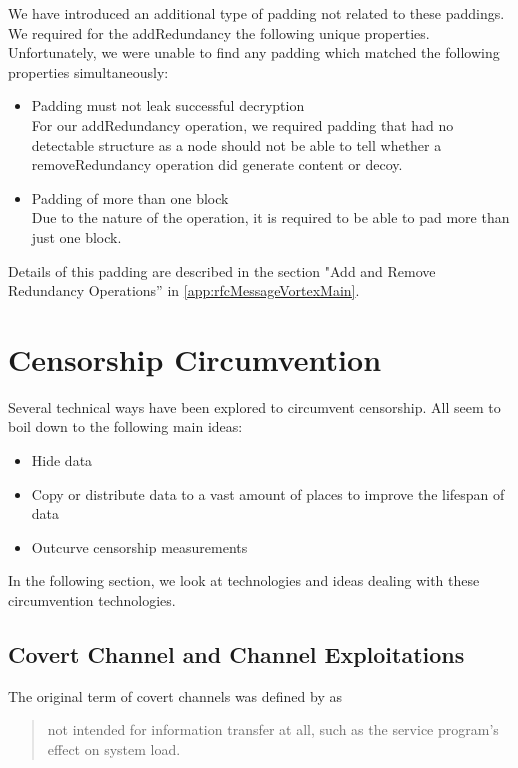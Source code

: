 We have introduced an additional type of padding not related to these paddings. We required for the addRedundancy the following unique properties. Unfortunately, we were unable to find any padding which matched the following properties simultaneously:

\begin{itemize}
	\item Padding must not leak successful decryption\\
	For our addRedundancy operation, we required padding that had no detectable structure as a node should not be able to tell whether a removeRedundancy operation did generate content or decoy. 
	\item Padding of more than one block\\
	Due to the nature of the operation, it is required to be able to pad more than just one block.
\end{itemize}

Details of this padding are described in the section "Add and Remove Redundancy Operations'' in \cref{app:rfcMessageVortexMain}. 

\chapter{Censorship Circumvention}
Several technical ways have been explored to circumvent censorship. All seem to boil down to the following main ideas:
\begin{itemize}
	\item Hide data
	\item Copy or distribute data to a vast amount of places to improve the lifespan of data
	\item Outcurve censorship measurements
\end{itemize}

In the following section, we look at technologies and ideas dealing with these circumvention technologies.

\section{Covert Channel and Channel Exploitations}
The original term of covert channels was defined by \citeauthor{Lampson73anote}\cite{Lampson73anote} as 

\begin{quote}
	not intended for information transfer at all, such as the service program's effect on system load.
\end{quote}

